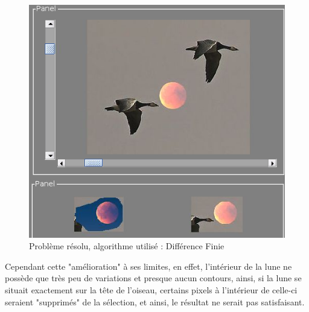 \begin{figure}[!h]
\centering
\includegraphics[scale=0.25]{Images/sol.png}
\caption{Problème résolu, algorithme utilisé : Différence Finie}
\end{figure}
\newpage
Cependant cette "amélioration" à ses limites, en effet, l'intérieur de la lune ne possède que très peu de variations et presque aucun contours, ainsi, si la lune se situait exactement sur la tête de l'oiseau, certains pixels à l'intérieur de celle-ci seraient "supprimés" de la sélection, et ainsi, le résultat ne serait pas satisfaisant.
